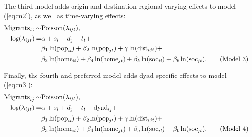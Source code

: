 \documentclass[11pt,parskip,abstracton,notitlepage, dvipsnames]{scrartcl}
\begin{document}
The third model adds origin and destination regional varying effects to model (\ref{eq:m2}), as well as time-varying effects:
\begin{align} \text{Migrants}_{ij} \sim & \text{Poisson}(\lambda_{ijt}), \notag \\
  \log(\lambda_{ijt}) = & \alpha +  o_i + d_j + t_t + \notag \\
                                        &\beta_1 \ln(\text{pop}_{it}) + \beta_2
                                          \ln(\text{pop}_{jt}) +
                                          \gamma \ln(\text{dist}_{ijt}) + \notag \\
                                        & \beta_3 \ln(\text{home}_{it}) +
                                          \beta_4 \ln(\text{home}_{jt}) +
                                          \beta_5 \ln(\text{soc}_{it}) + \beta_6
                                          \ln(\text{soc}_{jt}).  \tag{Model
                                          3} \label{eq:m3}
\end{align}

Finally, the fourth and preferred model adds dyad specific effects to model (\ref{eq:m3}):                                          
  \begin{align} \text{Migrants}_{ij} \sim & \text{Poisson}(\lambda_{ijt}), \notag \\
    \log(\lambda_{ijt}) = & \alpha +  o_i + d_j + t_t + \text{dyad}_{ij}+ \notag \\
                                          & \beta_1 \ln(\text{pop}_{it}) +
                                            \beta_2 \ln(\text{pop}_{jt}) +
                                            \gamma \ln(\text{dist}_{ijt}) + \notag \\
                                          & \beta_3 \ln(\text{home}_{it}) +
                                            \beta_4 \ln(\text{home}_{jt}) +
                                            \beta_5 \ln(\text{soc}_{it}) +
                                            \beta_6
                                            \ln(\text{soc}_{jt}). \tag{Model
                                            4} \label{eq:m4}
\end{align}
\end{document}
